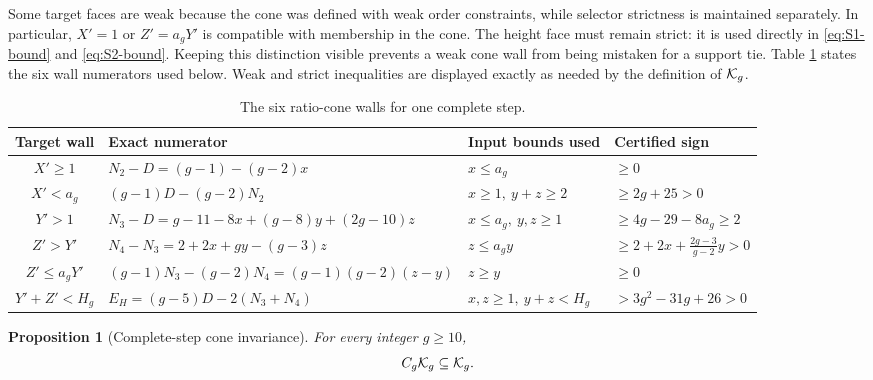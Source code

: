 \documentclass[11pt]{article}
\newtheorem{proposition}[theorem]{Proposition}
\theoremstyle{remark}
\numberwithin{equation}{section}
\begin{document}
Some target faces are weak because the cone was defined with weak order
constraints, while selector strictness is maintained separately.  In
particular, \(X'=1\) or \(Z'=a_gY'\) is compatible with membership in the
cone.  The height face must remain strict: it is used directly in
\eqref{eq:S1-bound} and \eqref{eq:S2-bound}.  Keeping this distinction
visible prevents a weak cone wall from being mistaken for a support tie.
Table \ref{tab:walls} states the six wall numerators used below.  Weak and
strict inequalities are displayed exactly as needed by the definition of
\(\mathcal{K}_g\).

\begin{table}[t]
\centering
\caption{The six ratio-cone walls for one complete step.}
\label{tab:walls}
\scriptsize
\begin{tabularx}{\textwidth}{@{}c X X X@{}}
\toprule
\textnormal{Target wall} & \textnormal{Exact numerator} &
\textnormal{Input bounds used} & \textnormal{Certified sign}\\
\midrule
\(X'\geq1\) &
\(N_2-D=(g-1)-(g-2)x\) &
\(x\leq a_g\) &
\(\geq0\)\\
\(X'<a_g\) &
\((g-1)D-(g-2)N_2\) &
\(x\geq1,\ y+z\geq2\) &
\(\geq2g+25>0\)\\
\(Y'>1\) &
\(N_3-D=g-11-8x+(g-8)y+(2g-10)z\) &
\(x\leq a_g,\ y,z\geq1\) &
\(\geq4g-29-8a_g\geq2\)\\
\(Z'>Y'\) &
\(N_4-N_3=2+2x+gy-(g-3)z\) &
\(z\leq a_gy\) &
\(\geq2+2x+\frac{2g-3}{g-2}y>0\)\\
\(Z'\leq a_gY'\) &
\((g-1)N_3-(g-2)N_4=(g-1)(g-2)(z-y)\) &
\(z\geq y\) &
\(\geq0\)\\
\(Y'+Z'<H_g\) &
\(E_H=(g-5)D-2(N_3+N_4)\) &
\(x,z\geq1,\ y+z<H_g\) &
\(>3g^2-31g+26>0\)\\
\bottomrule
\end{tabularx}
\end{table}

\begin{proposition}[Complete-step cone invariance]\label{prop:invariance}
For every integer \(g\geq10\),
\[
C_g\mathcal{K}_g\subseteq\mathcal{K}_g.
\]
\end{proposition}
\end{document}
